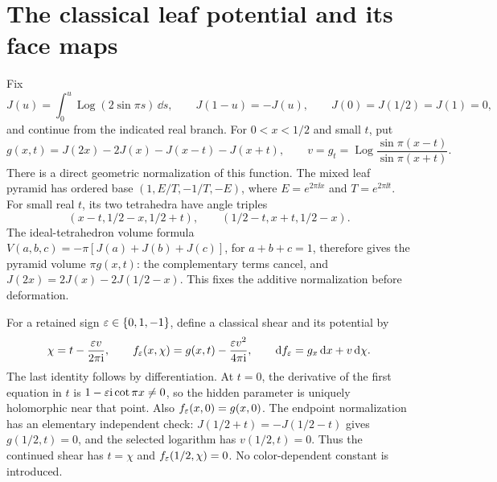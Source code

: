 \section{The classical leaf potential and its face maps}

Fix
\[
 J(u)=\int_0^u\operatorname{Log}(2\sin\pi s)\,\dd s,
 \qquad J(1-u)=-J(u),\qquad J(0)=J(1/2)=J(1)=0,
\]
and continue from the indicated real branch. For \(0<x<1/2\) and
small \(t\), put
\[
 g(x,t)=J(2x)-2J(x)-J(x-t)-J(x+t),\qquad
 v=g_t=\operatorname{Log}\frac{\sin\pi(x-t)}{\sin\pi(x+t)}.
\]
There is a direct geometric normalization of this function. The mixed
leaf pyramid has ordered base
\((1,E/T,-1/T,-E)\), where \(E=e^{2\pi\ii x}\) and
\(T=e^{2\pi\ii t}\). For small real \(t\), its two tetrahedra have
angle triples
\[
 (x-t,1/2-x,1/2+t),\qquad
 (1/2-t,x+t,1/2-x).
\]
The ideal-tetrahedron volume formula
\(V(a,b,c)=-\pi[J(a)+J(b)+J(c)]\), for \(a+b+c=1\),
therefore gives the pyramid volume \(\pi g(x,t)\): the complementary
terms cancel, and
\(J(2x)=2J(x)-2J(1/2-x)\).
This fixes the additive normalization before deformation.

For a retained sign \(\varepsilon\in\{0,1,-1\}\), define a classical shear
and its potential by
\begin{equation}\label{eq:app-shear}
 \chi=t-\frac{\varepsilon v}{2\pi\mathrm i},\qquad
 f_\varepsilon(x,\chi)=g(x,t)-\frac{\varepsilon v^2}{4\pi\mathrm i},\qquad
 \mathrm d f_\varepsilon=g_x\,\mathrm d x+v\,\mathrm d\chi.
\end{equation}
The last identity follows by differentiation. At \(t=0\), the derivative
of the first equation in \(t\) is
\(1-\varepsilon\mathrm i\cot\pi x\ne0\), so the hidden parameter is uniquely
holomorphic near that point. Also \(f_\varepsilon(x,0)=g(x,0)\).
The endpoint normalization has an elementary independent check:
\(J(1/2+t)=-J(1/2-t)\) gives \(g(1/2,t)=0\), and the selected
logarithm has \(v(1/2,t)=0\). Thus the continued shear has
\(t=\chi\) and \(f_\varepsilon(1/2,\chi)=0\). No color-dependent constant
is introduced.

